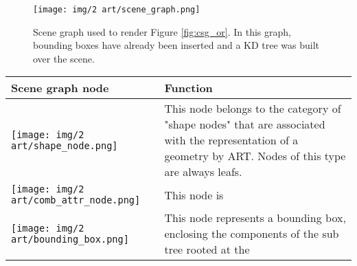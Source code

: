 \begin{figure}[H]
	\centering
	
	\texttt{[image: img/2 art/scene\_graph.png]}
	\caption{Scene graph used to render Figure \ref{fig:csg_or}. In this graph, bounding boxes have already been inserted and a KD tree was built over the scene.} 
	\label{fig:scene_graph}
\end{figure}

\begin{table}
  \centering
  {\footnotesize
    \begin{tabular}{m{3cm}m{8cm}}
      \toprule
      Scene graph node & Function  \\
      \midrule
      \texttt{[image: img/2 art/shape\_node.png]} & This node belongs
                                                              to the category of
                                                              "shape nodes" that
                                                              are associated
                                                              with the
                                                              representation of
                                                              a geometry by
                                                              ART. Nodes of this
                                                              type are always
                                                              leafs.\\
      \midrule
      \texttt{[image: img/2 art/comb\_attr\_node.png]} & This node is
      \\
      \midrule
    \texttt{[image: img/2 art/bounding\_box.png]} & This node
                                                                       represents
                                                                       a
                                                                       bounding
                                                                       box,
                                                                       enclosing
                                                                       the
                                                                       components
                                                                       of the
                                                                       sub tree
                                                                       rooted at
                                                                       the

\end{tabular}}
\end{table}
